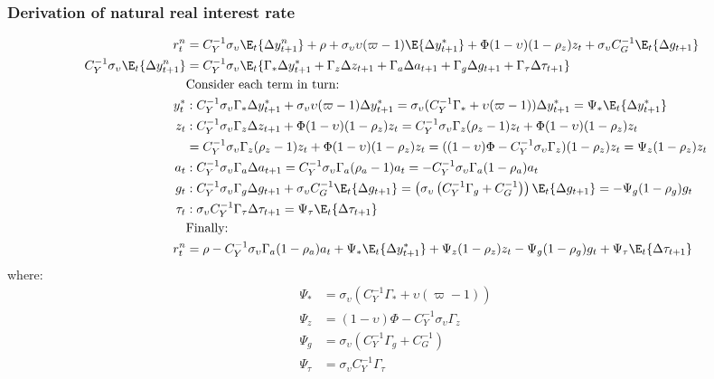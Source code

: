\subsubsection*{Derivation of natural real interest rate}
\begin{align}\label{eq:appendix_natural_real_interest_rate_beginning}
    r^n_t  &= C_Y^{-1}\sigma_\upsilon \E_t \{\Delta y^n_{t+1}\} + \rho + \sigma_\upsilon \upsilon (\varpi - 1)\E \{\Delta y_{t+1}^* \}  + \Phi (1-\upsilon)(1-\rho_z)z_t + \sigma_\upsilon C_G^{-1}\E_t \{ \Delta g_{t+1} \} \\
    C_Y^{-1} \sigma_\upsilon \E_t\{\Delta y^n_{t+1}\} &= C_Y^{-1} \sigma_\upsilon \E_t\{\Gamma_* \Delta y^*_{t+1} + \Gamma_z \Delta z_{t+1} + \Gamma_a \Delta a_{t+1} + \Gamma_g \Delta g_{t+1} + \Gamma_\tau \Delta \tau_{t+1}\}\\
    &\text{Consider each term in turn:}\nonumber\\
    y^*_t&: C_Y^{-1} \sigma_\upsilon \Gamma_* \Delta y^*_{t+1} + \sigma_\upsilon \upsilon(\varpi-1)\Delta y^*_{t+1} = \sigma_\upsilon(C_Y^{-1} \Gamma_* + \upsilon(\varpi-1))\Delta y^*_{t+1} = \Psi_* \E_t \{\Delta y^*_{t+1}\}\\
    z_t&: C_Y^{-1} \sigma_\upsilon \Gamma_z \Delta z_{t+1} + \Phi (1-\upsilon) (1-\rho_z)z_t = C_Y^{-1} \sigma_\upsilon \Gamma_z (\rho_z - 1)z_t + \Phi (1-\upsilon)(1-\rho_z)z_t\\
    &= C_Y^{-1} \sigma_\upsilon \Gamma_z (\rho_z - 1)z_t + \Phi (1-\upsilon)(1-\rho_z)z_t = ((1-\upsilon)\Phi - C_Y^{-1} \sigma_\upsilon \Gamma_z)(1-\rho_z)z_t = \Psi_z (1-\rho_z) z_t\\
    a_t&: C_Y^{-1} \sigma_\upsilon \Gamma_a \Delta a_{t+1} = C_Y^{-1} \sigma_\upsilon \Gamma_a (\rho_a - 1)a_t = - C_Y^{-1} \sigma_\upsilon \Gamma_a (1 - \rho_a)a_t\\
    g_t&: C_Y^{-1} \sigma_\upsilon \Gamma_g \Delta g_{t+1} + \sigma_\upsilon C_G^{-1}\E_t \{ \Delta g_{t+1} \}  = \left( \sigma_\upsilon \left( C_Y^{-1} \Gamma_g + C_G^{-1} \right)\right) \E_t \{ \Delta g_{t+1}\} = -\Psi_g (1-\rho_g)g_t\\
    \tau_t&: \sigma_\upsilon C_Y^{-1} \Gamma_\tau \Delta \tau_{t+1} = \Psi_\tau \E_t \{ \Delta \tau_{t+1}\}\\
    &\text{Finally:}\nonumber\\
    r^n_t  &= \rho - C_Y^{-1} \sigma_\upsilon \Gamma_a (1 - \rho_a)a_t + \Psi_* \E_t \{\Delta y^*_{t+1}\} + \Psi_z (1-\rho_z) z_t - \Psi_g (1-\rho_g)g_t +\Psi_\tau \E_t \{ \Delta \tau_{t+1}\}
\end{align}
where:
\begin{align}
    \Psi_* &= \sigma_\upsilon(C_Y^{-1} \Gamma_* + \upsilon(\varpi-1)) \\
    \Psi_z &= (1-\upsilon)\Phi - C_Y^{-1} \sigma_\upsilon \Gamma_z \\
    \Psi_g &= \sigma_\upsilon \left( C_Y^{-1} \Gamma_g + C_G^{-1} \right)\\
    \Psi_\tau &= \sigma_\upsilon C_Y^{-1} \Gamma_\tau \label{eq:appendix_natural_real_interest_rate_end}
\end{align}
\newpage
